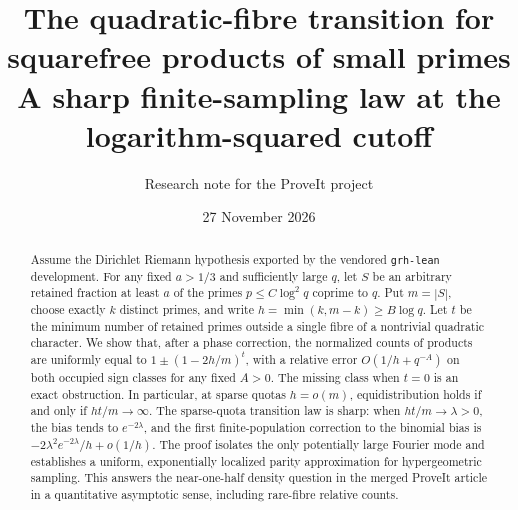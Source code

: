 \documentclass[11pt]{article}
\title{The quadratic-fibre transition for squarefree products of small primes\\[3pt]\large A sharp finite-sampling law at the logarithm-squared cutoff}
\author{Research note for the ProveIt project}
\date{27 November 2026}
\theoremstyle{remark}\newtheorem{remark}[theorem]{Remark}
\begin{document}
\maketitle
\begin{abstract}
Assume the Dirichlet Riemann hypothesis exported by the vendored \texttt{grh-lean} development. For any fixed $a>1/3$ and sufficiently large $q$, let $S$ be an arbitrary retained fraction at least $a$ of the primes $p\le C\log^2 q$ coprime to $q$. Put $m=|S|$, choose exactly $k$ distinct primes, and write $h=\min(k,m-k)\ge B\log q$. Let $t$ be the minimum number of retained primes outside a single fibre of a nontrivial quadratic character. We show that, after a phase correction, the normalized counts of products are uniformly equal to $1\pm (1-2h/m)^t$, with a relative error $O(1/h+q^{-A})$ on both occupied sign classes for any fixed $A>0$. The missing class when $t=0$ is an exact obstruction. In particular, at sparse quotas $h=o(m)$, equidistribution holds if and only if $ht/m\to\infty$. The sparse-quota transition law is sharp: when $ht/m\to\lambda>0$, the bias tends to $e^{-2\lambda}$, and the first finite-population correction to the binomial bias is $-2\lambda^2e^{-2\lambda}/h+o(1/h)$. The proof isolates the only potentially large Fourier mode and establishes a uniform, exponentially localized parity approximation for hypergeometric sampling. This answers the near-one-half density question in the merged ProveIt article in a quantitative asymptotic sense, including rare-fibre relative counts.
\end{abstract}
\end{document}
